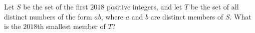 Let $S$ be the set of the first $2018$ positive integers, and let $T$ be the set of all distinct numbers of the form $ab$, where $a$ and $b$ are distinct members of $S$. What is the $2018$th smallest member of $T$?